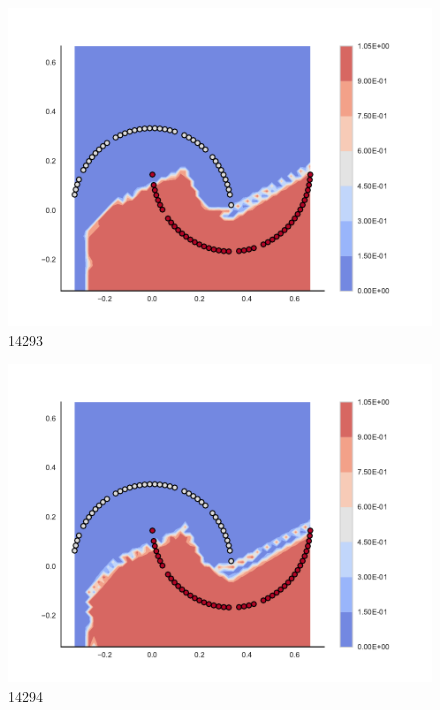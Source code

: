\begin{subfigure}[b]{0.09\textwidth}
    \includegraphics[clip, trim=2.35cm 1.75cm 4.5cm 0cm,width=\textwidth]{img/convergence/14293.pdf}
    \caption{14293}
    \label{fig:convergence_14293}
\end{subfigure}
%
\begin{subfigure}[b]{0.09\textwidth}
    \includegraphics[clip, trim=2.35cm 1.75cm 4.5cm 0cm,width=\textwidth]{img/convergence/14294.pdf}
    \caption{14294}
    \label{fig:convergence_14294}
\end{subfigure}
%

